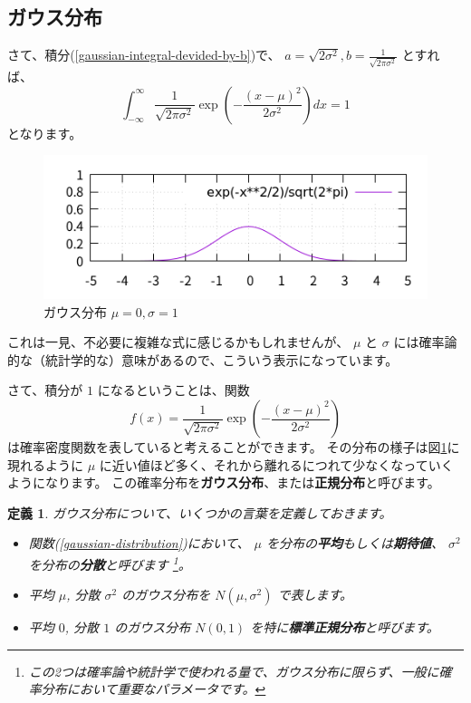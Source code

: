 \documentclass[uplatex,dvipdfmx]{jsarticle}
\newtheorem{dfn}[thm]{定義}
\begin{document}
\subsection{ガウス分布}
  さて、積分(\ref{gaussian-integral-devided-by-b})で、 $a = \sqrt{2\sigma^2}, b = \frac{1}{\sqrt{2\pi\sigma^2}}$ とすれば、
  \begin{equation}
    \label{integrate-gaussian-distribution}
    \int_{-\infty}^{\infty} \frac{1}{\sqrt{2\pi\sigma^2}} \exp(-\frac{(x-\mu)^2}{2\sigma^2}) dx = 1
  \end{equation}
  となります。
  \begin{figure}
    \centering
    \includegraphics[width=15cm]{gaussian5.png}
    \caption{ガウス分布 $\mu = 0, \sigma = 1$}
    \label{gaussian5}
  \end{figure}
  これは一見、不必要に複雑な式に感じるかもしれませんが、
  $\mu$ と $\sigma$ には確率論的な（統計学的な）意味があるので、こういう表示になっています。
  
  さて、積分が $1$ になるということは、関数
  \begin{equation}
    \label{gaussian-distribution}
    f(x) = \frac{1}{\sqrt{2\pi\sigma^2}} \exp(-\frac{(x-\mu)^2}{2\sigma^2})
  \end{equation}
  は確率密度関数を表していると考えることができます。
  その分布の様子は図\ref{gaussian5}に現れるように
  $\mu$ に近い値ほど多く、それから離れるにつれて少なくなっていくようになります。
  この確率分布を\textbf{ガウス分布}、または\textbf{正規分布}と呼びます。
  
  \begin{dfn}
    ガウス分布について、いくつかの言葉を定義しておきます。
    \begin{itemize}
      \item 関数(\ref{gaussian-distribution})において、
      $\mu$ を分布の\textbf{平均}もしくは\textbf{期待値}、
      $\sigma^2$ を分布の\textbf{分散}と呼びます
      \footnote{
        この2つは確率論や統計学で使われる量で、ガウス分布に限らず、一般に確率分布において重要なパラメータです。
      }。
      \item 平均 $\mu$, 分散 $\sigma^2$ のガウス分布を $N(\mu, \sigma^2)$ で表します。
      \item 平均 $0$, 分散 $1$ のガウス分布 $N(0, 1)$ を特に\textbf{標準正規分布}と呼びます。
    \end{itemize}
  \end{dfn}
\end{document}
